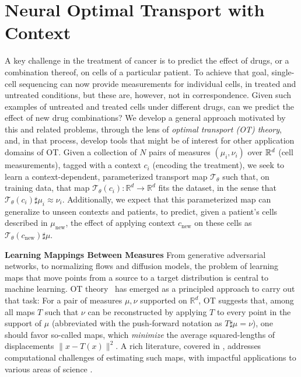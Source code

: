 \chapter{Neural Optimal Transport with Context}
\label{cha:condot}


%


 A key challenge in the treatment of cancer is to predict the effect of drugs, or a combination thereof, on cells of a particular patient. To achieve that goal, single-cell sequencing can now provide measurements for individual cells, in treated and untreated conditions, but these are, however, not in correspondence.  Given such examples of untreated and treated cells under different drugs, can we predict the effect of new drug combinations?  We develop a general approach motivated by this and related problems, through the lens of {\em optimal transport (OT) theory}, and, in that process, develop tools that might be of interest for other application domains of OT. Given a collection of $N$ pairs of measures $(\mu_i,\nu_i)$ over $\mathbb{R}^d$ (cell measurements), tagged with a context $c_i$ (encoding the treatment), we seek to learn a context-dependent, parameterized transport map $\mathcal{T}_{\theta}$ such that, on training data, that map $\mathcal{T}_{\theta}(c_i):\mathbb{R}^d\rightarrow\mathbb{R}^d$ fits the dataset, in the sense that $\mathcal{T}_{\theta}(c_i) \sharp\mu_i \approx \nu_i$. Additionally, we expect that this parameterized map can generalize to unseen contexts and patients, to predict, given a patient's cells described in $\mu_{\text{new}}$, the effect of applying context $c_{\text{new}}$ on these cells as $\mathcal{T}_{\theta}(c_{\text{new}})\sharp\mu$.

 \textbf{Learning Mappings Between Measures }
From generative adversarial networks, to normalizing flows and diffusion models, the problem of learning maps that move points from a source to a target distribution is central to machine learning. OT theory~\citep{santambrogio2015optimal} has emerged as a principled approach to carry out that task: For a pair of measures $\mu,\nu$ supported on $\mathbb{R}^d$, OT suggests that, among all maps $T$ such that $\nu$ can be reconstructed by applying $T$ to every point in the support of $\mu$ (abbreviated with the push-forward notation as $T\sharp\mu=\nu$), one should favor so-called \citeauthor{monge1781histoire} maps, which \textit{minimize} the average squared-lengths of displacements $\|x-T(x)\|^{2}$. A rich literature, covered in \citet{peyre2019computational}, addresses computational challenges of estimating such maps, with impactful applications to various areas of science \citep[cf.,][]{hashimoto2016learning,schmitz2018wasserstein,schiebinger2019optimal,yang2020predicting,janati2020multi,bunne2022recovering}.


